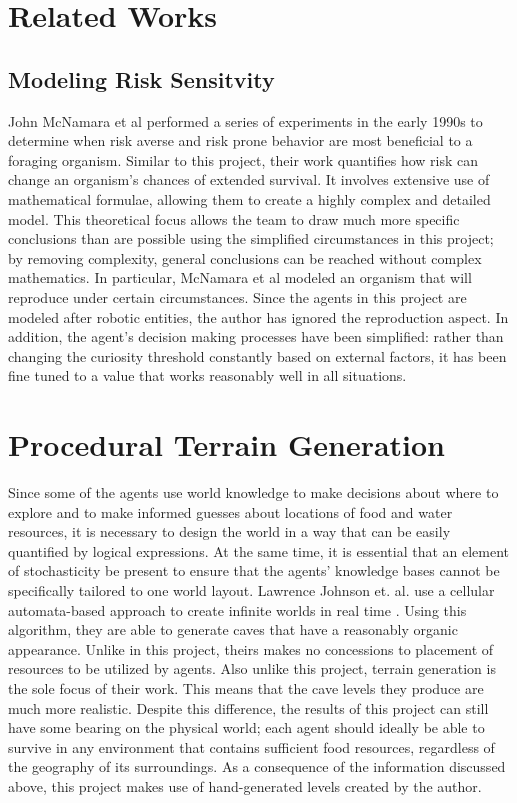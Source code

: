 \documentclass[12pt]{article}
\begin{document}
\pagebreak
\section{Related Works}
\subsection{Modeling Risk Sensitvity}
John McNamara et al performed a series of experiments in the early 1990s to determine when risk averse and risk prone behavior are most beneficial to a foraging organism\cite{mcnamara}. Similar to this project, their work quantifies how risk can change an organism’s chances of extended survival. It involves extensive use of mathematical formulae, allowing them to create a highly complex and detailed model. This theoretical focus allows the team to draw much more specific conclusions than are possible using the simplified circumstances in this project; by removing complexity, general conclusions can be reached without complex mathematics. In particular, McNamara et al modeled an organism that will reproduce under certain circumstances. Since the agents in this project are modeled after robotic entities, the author has ignored the reproduction aspect. In addition, the agent's decision making processes have been simplified: rather than changing the curiosity threshold constantly based on external factors, it has been fine tuned to a value that works reasonably well in all situations.


\section{Procedural Terrain Generation}
Since some of the agents use world knowledge to make decisions about where to explore and to make informed guesses about locations of food and water resources, it is necessary to design the world in a way that can be easily quantified by logical expressions. At the same time, it is essential that an element of stochasticity be present to ensure that the agents’ knowledge bases cannot be specifically tailored to one world layout. Lawrence Johnson et. al. use a cellular automata-based approach to create infinite worlds in real time \cite{johnson}. Using this algorithm, they are able to generate caves that have a reasonably organic appearance. Unlike in this project, theirs makes no concessions to placement of resources to be utilized by agents. Also unlike this project, terrain generation is the sole focus of their work. This means that the cave levels they produce are much more realistic. Despite this difference, the results of this project can still have some bearing on the physical world; each agent should ideally be able to survive in any environment that contains sufficient food resources, regardless of the geography of its surroundings. As a consequence of the information discussed above, this project makes use of hand-generated levels created by the author.
\end{document}
